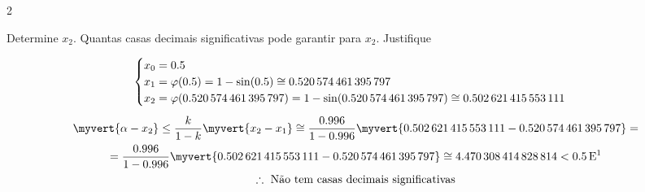 \documentclass[CN_A-Tests_Resolutions.tex]{subfiles}
\begin{document}
\begin{questionBox}2{} %

  Determine \(x_2\). Quantas casas decimais significativas pode garantir para \(x_2\). Justifique

  \answer{}

  \begin{gather*}
    \begin{cases}
      x_0= 0.5
      \\ x_1= \varphi(0.5)=1-\sin(0.5)\cong\num{0.520574461395797}
      \\ x_2= \varphi(\num{0.520574461395797})
      =1-\sin(\num{0.520574461395797})\cong\num{0.502621415553111}
    \end{cases}
    \\[1ex]
    \myvert{\alpha-x_2}
    \leq
    \frac{k}{1-k}\myvert{x_2-x_1}
    \cong \frac{0.996}{1-0.996}\myvert{\num{0.502621415553111}-\num{0.520574461395797}}
    = \\
    = \frac{0.996}{1-0.996}\myvert{\num{0.502621415553111}-\num{0.520574461395797}}
    \cong\num{4.470308414828814}
    <0.5\E1
    \\
    \therefore\text{ Não tem casas decimais significativas}
  \end{gather*}

\end{questionBox}
\end{document}
